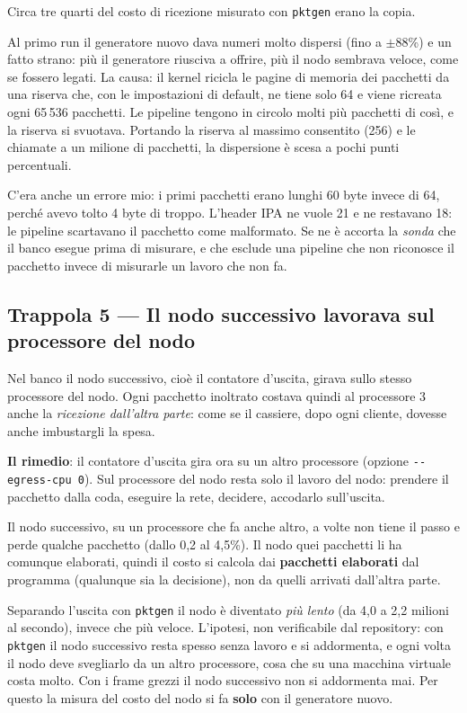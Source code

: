 \documentclass[11pt,a4paper,oneside]{report}
\begin{document}
Circa tre quarti del costo di ricezione misurato con \texttt{pktgen} erano la
copia.

\begin{prima}
Al primo run il generatore nuovo dava numeri molto dispersi (fino a $\pm$88\%) e
un fatto strano: più il generatore riusciva a offrire, più il nodo sembrava
veloce, come se fossero legati. La causa: il kernel ricicla le pagine di memoria
dei pacchetti da una riserva che, con le impostazioni di default, ne tiene solo
64 e viene ricreata ogni 65\,536 pacchetti. Le pipeline tengono in circolo molti
più pacchetti di così, e la riserva si svuotava. Portando la riserva al massimo
consentito (256) e le chiamate a un milione di pacchetti, la dispersione è
scesa a pochi punti percentuali.

C'era anche un errore mio: i primi pacchetti erano lunghi 60 byte invece di 64,
perché avevo tolto 4 byte di troppo. L'header IPA ne vuole 21 e ne restavano
18: le pipeline scartavano il pacchetto come malformato. Se ne è accorta la
\emph{sonda} che il banco esegue prima di misurare, e che esclude una pipeline
che non riconosce il pacchetto invece di misurarle un lavoro che non fa.
\end{prima}

\subsection*{Trappola 5 --- Il nodo successivo lavorava sul processore del nodo}

Nel banco il nodo successivo, cioè il contatore d'uscita, girava sullo stesso
processore del nodo. Ogni pacchetto inoltrato costava quindi al processore 3
anche la \emph{ricezione dall'altra parte}: come se il cassiere, dopo ogni
cliente, dovesse anche imbustargli la spesa.

\textbf{Il rimedio}: il contatore d'uscita gira ora su un altro processore
(opzione \texttt{-{}-egress-cpu 0}). Sul processore del nodo resta solo il lavoro
del nodo: prendere il pacchetto dalla coda, eseguire la rete, decidere,
accodarlo sull'uscita.

Il nodo successivo, su un processore che fa anche altro, a volte non tiene il
passo e perde qualche pacchetto (dallo 0,2 al 4,5\%). Il nodo quei pacchetti li ha
comunque elaborati, quindi il costo si calcola dai \textbf{pacchetti elaborati}
dal programma (qualunque sia la decisione), non da quelli arrivati dall'altra
parte.

\begin{prima}
Separando l'uscita con \texttt{pktgen} il nodo è diventato \emph{più lento}
(da 4,0 a 2,2 milioni al secondo), invece che più veloce. L'ipotesi, non
verificabile dal repository: con \texttt{pktgen} il nodo successivo resta spesso
senza lavoro e si addormenta, e ogni volta il nodo deve svegliarlo da un altro
processore, cosa che su una macchina virtuale costa molto. Con i frame grezzi il
nodo successivo non si addormenta mai. Per questo la misura del costo del nodo
si fa \textbf{solo} con il generatore nuovo.
\end{prima}
\end{document}
